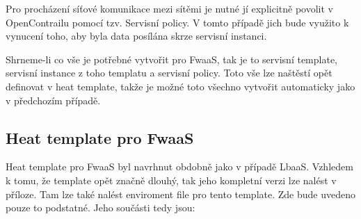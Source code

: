 Pro procházení síťové komunikace mezi sítěmi je nutné jí explicitně povolit v OpenContrailu pomocí tzv. Servisní policy. V tomto případě jich bude využito k vynucení toho, aby byla data posílána skrze servisní instanci.

Shrneme-li co vše je potřebné vytvořit pro FwaaS, tak je to servisní template, servisní instance z toho templatu a servisní policy. Toto vše lze naštěstí opět definovat v heat template, takže je možné toto všechno vytvořit automaticky jako v předchozím případě.

\subsection{Heat template pro FwaaS}

Heat template pro FwaaS byl navrhnut obdobně jako v případě LbaaS. Vzhledem k tomu, že template opět značně dlouhý, tak jeho kompletní verzi lze nalést v příloze. Tam lze také nalést enviroment file pro tento template. Zde bude uvedeno pouze to podstatné. Jeho součásti tedy jsou: 

